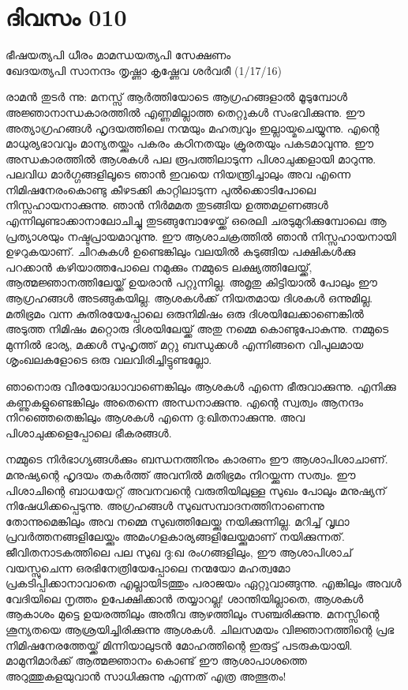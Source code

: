  
\section{ദിവസം 010}

\begin{center}
ഭീഷയത്യപി ധീരം മാമന്ധയത്യപി സേക്ഷണം\\
ഖേദയത്യപി സാനന്ദം തൃഷ്ണാ കൃഷ്ണേവ ശർവരീ (1/17/16)\\ 
\end{center}

രാമന്‍ തുടര്‍ ന്നു: മനസ്സ്‌ ആര്‍ത്തിയോടെ ആഗ്രഹങ്ങളാല്‍ മൂടുമ്പോള്‍ അജ്ഞാനാന്ധകാരത്തില്‍ എണ്ണമില്ലാത്ത തെറ്റുകള്‍ സംഭവിക്കുന്നു. ഈ അത്യാഗ്രഹങ്ങള്‍ ഹൃദയത്തിലെ നന്മയും മഹത്വവും ഇല്ലായ്മചെയ്യുന്നു. എന്റെ മാധുര്യഭാവവും മാന്യതയ്ക്കും പകരം കഠിനതയും ക്രൂരതയും പകടമാവുന്നു. ഈ അന്ധകാരത്തില്‍ ആശകള്‍ പല രൂപത്തിലാടുന്ന പിശാചുക്കളായി മാറുന്നു. പലവിധ മാര്‍ഗ്ഗങ്ങളിലൂടെ ഞാന്‍ ഇവയെ നിയന്ത്രിച്ചാലും അവ എന്നെ നിമിഷനേരംകൊണ്ടു കീഴടക്കി കാറ്റിലാടുന്ന പുല്‍ക്കൊടിപോലെ നിസ്സഹായനാക്കുന്നു. ഞാന്‍ നിര്‍മമത തുടങ്ങിയ ഉത്തമഗുണങ്ങള്‍ എന്നിലുണ്ടാക്കാനാലോചിച്ചു തുടങ്ങുമ്പോഴേയ്ക്ക്‌ ഒരെലി ചരടുമുറിക്കുമ്പോലെ ആ പ്രത്യാശയും നഷ്ടപ്രായമാവുന്നു. ഈ ആശാചക്രത്തില്‍ ഞാന്‍ നിസ്സഹായനായി ഉഴറുകയാണ്‌. ചിറകുകള്‍ ഉണ്ടെങ്കിലും വലയില്‍ കുടുങ്ങിയ പക്ഷികള്‍ക്കു പറക്കാന്‍ കഴിയാത്തപോലെ നമുക്കും നമ്മുടെ ലക്ഷ്യത്തിലേയ്ക്ക്, ആത്മജ്ഞാനത്തിലേയ്ക്ക്‌ ഉയരാന്‍ പറ്റുന്നില്ല. അമൃതു കിട്ടിയാല്‍ പോലും ഈ ആഗ്രഹങ്ങള്‍ അടങ്ങുകയില്ല. ആശകള്‍ക്ക്‌ നിയതമായ ദിശകള്‍ ഒന്നുമില്ല. മതിഭ്രമം വന്ന കുതിരയേപ്പോലെ ഒരുനിമിഷം ഒരു ദിശയിലേക്കാണെങ്കില്‍ അടുത്ത നിമിഷം മറ്റൊരു ദിശയിലേയ്ക്ക്‌ അതു നമ്മെ കൊണ്ടുപോകുന്നു. നമ്മുടെ മുന്നില്‍ ഭാര്യ, മക്കള്‍ സുഹൃത്ത്‌ മറ്റു ബന്ധുക്കള്‍ എന്നിങ്ങനെ വിപുലമായ ശൃംഖലകളോടെ ഒരു വലവിരിച്ചിട്ടുണ്ടല്ലോ.

ഞാനൊരു വീരയോദ്ധാവാണെങ്കിലും ആശകള്‍ എന്നെ ഭീരുവാക്കുന്നു.
എനിക്കു കണ്ണുകളുണ്ടെങ്കിലും അതെന്നെ അന്ധനാക്കുന്നു.
എന്റെ സ്വത്വം ആനന്ദം നിറഞ്ഞെതെങ്കിലും ആശകള്‍ എന്നെ ദു:ഖിതനാക്കുന്നു.
അവ പിശാചുക്കളെപ്പോലെ ഭീകരങ്ങള്‍. 

നമ്മുടെ നിര്‍ഭാഗ്യങ്ങള്‍ക്കും ബന്ധനത്തിനും കാരണം ഈ ആശാപിശാചാണ്‌. മനുഷ്യന്റെ ഹൃദയം തകര്‍ത്ത്‌ അവനില്‍ മതിഭ്രമം നിറയ്ക്കുന്ന സത്വം. ഈ പിശാചിന്റെ ബാധയേറ്റ്‌ അവനവന്റെ വരുതിയിലുള്ള സുഖം പോലും മനുഷ്യന്‌ നിഷേധിക്കപ്പെടുന്നു. അഗ്രഹങ്ങള്‍ സുഖസമ്പാദനത്തിനാണെന്നു തോന്നുമെങ്കിലും അവ നമ്മെ സുഖത്തിലേയ്ക്കു നയിക്കുന്നില്ല. മറിച്ച്‌ വൃഥാ പ്രവര്‍ത്തനങ്ങളിലേയ്ക്കും അമംഗളകാര്യങ്ങളിലേയ്ക്കുമാണ്‌ നയിക്കുന്നത്‌. ജീവിതനാടകത്തിലെ പല സുഖ ദു:ഖ രംഗങ്ങളിലും, ഈ ആശാപിശാച്‌ വയസ്സുചെന്ന ഒരഭിനേത്രിയേപ്പോലെ നന്മയോ മഹത്വമോ പ്രകടിപ്പിക്കാനാവാതെ എല്ലായിടത്തും പരാജയം ഏറ്റുവാങ്ങുന്നു. എങ്കിലും അവള്‍ വേദിയിലെ നൃത്തം ഉപേക്ഷിക്കാന്‍ തയ്യാറല്ല! ശാന്തിയില്ലാതെ, ആശകള്‍ ആകാശം മുട്ടെ ഉയരത്തിലും അതീവ ആഴത്തിലും സഞ്ചരിക്കുന്നു. മനസ്സിന്റെ ശൂന്യതയെ ആശ്രയിച്ചിരിക്കുന്നു ആശകള്‍. ചിലസമയം വിജ്ഞാനത്തിന്റെ പ്രഭ നിമിഷനേരത്തേയ്ക്ക്‌ മിന്നിയാലുടന്‍ മോഹത്തിന്റെ ഇരുട്ട്‌ പടരുകയായി. മാമുനിമാര്‍ക്ക്‌ ആത്മജ്ഞാനം കൊണ്ട്‌ ഈ ആശാപാശത്തെ അറുത്തുകളയുവാന്‍ സാധിക്കുന്നു എന്നത്‌ എത്ര അത്ഭുതം!
